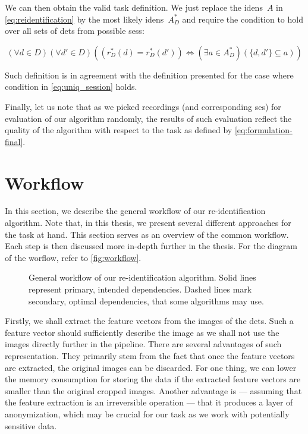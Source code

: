 We can then obtain the valid task definition. We just replace the
\glspl{iden}~$A$ in \autoref{eq:reidentification} by the most likely
\glspl{iden}~$A_D^*$ and require the condition to hold over all sets of
\glspl{det} from possible \glspl{ses}:

\begin{equation}
(\forall d \in D) (\forall d' \in D) ((r_D^*(d) = r_D^*(d')) \Leftrightarrow (\exists a \in A_D^*) (\{d, d'\} \subseteq a))
\label{eq:formulation-final}
\end{equation}


Such definition is in agreement with the definition presented for the case where condition in \autoref{eq:uniq_session} holds.


Finally, let us note that as we picked recordings (and corresponding \gls{ses}) for evaluation of our algorithm randomly, the results of such evaluation reflect the quality of the algorithm with respect to the task as defined by \autoref{eq:formulation-final}.


\section{Workflow}

\label{sec:workflow}


In this section, we describe the general workflow of our re-identification algorithm. Note that, in this thesis, we present several different approaches for the task at hand. This section serves as an overview of the common workflow. Each step is then discussed more in-depth further in the thesis. For the diagram of the worflow, refer to \autoref{fig:workflow}.

\begin{figure}
    \centering
    \def\svgwidth{\textwidth}
    
    \caption[General workflow of our re-identification algorithm]{General workflow of our re-identification algorithm. Solid lines represent primary, intended dependencies.
    Dashed lines mark secondary, optimal dependencies, that some algorithms may use.}
    \label{fig:workflow}
\end{figure}

Firstly, we shall extract the feature vectors from the images of the \glspl{det}. Such a feature vector should sufficiently describe the image as we shall not use the images directly further in the pipeline. There are several advantages of such representation. They primarily stem from the fact that once the feature vectors are extracted, the original images can be discarded. For one thing, we can lower the memory consumption for storing the data if the extracted feature vectors are smaller than the original cropped images. Another advantage is --- assuming that the feature extraction is an irreversible operation --- that it produces a layer of anonymization, which may be crucial for our task as we work with potentially sensitive data.

